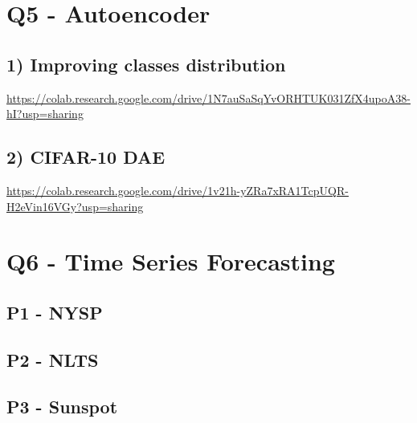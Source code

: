 \documentclass[a4paper]{article}    %
\begin{document}
\section{Q5 - Autoencoder}

\subsection{1) Improving classes distribution}

\href{https://colab.research.google.com/drive/1N7auSaSqYvORHTUK031ZfX4upoA38-hI?usp=sharing}{https://colab.research.google.com/drive/1N7auSaSqYvORHTUK031ZfX4upoA38-hI?usp=sharing}

\subsection{2) CIFAR-10 DAE}

\href{https://colab.research.google.com/drive/1v21h-yZRa7xRA1TcpUQR-H2eVin16VGy?usp=sharing}{https://colab.research.google.com/drive/1v21h-yZRa7xRA1TcpUQR-H2eVin16VGy?usp=sharing}

\section{Q6 - Time Series Forecasting}

\subsection{P1 - NYSP}

\subsection{P2 - NLTS}

\subsection{P3 - Sunspot}
\end{document}
